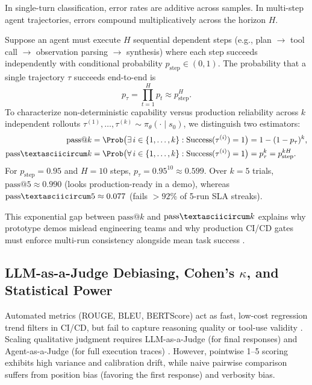 \documentclass[../../../../master.tex]{subfiles}
\begin{document}
In single-turn classification, error rates are additive across samples. In multi-step agent trajectories, errors compound multiplicatively across the horizon $H$.

\begin{coremath}
Suppose an agent must execute $H$ sequential dependent steps (e.g., plan $\to$ tool call $\to$ observation parsing $\to$ synthesis) where each step succeeds independently with conditional probability $p_{\mathrm{step}} \in (0,1)$. The probability that a single trajectory $\tau$ succeeds end-to-end is
\begin{equation}
  p_\tau = \prod_{t=1}^{H} p_t \approx p_{\mathrm{step}}^{H}.
  \label{eq:ops:horizon_decay}
\end{equation}
To characterize non-deterministic capability versus production reliability across $k$ independent rollouts $\tau^{(1)},\dots,\tau^{(k)} \sim \pi_\theta(\cdot \mid s_0)$, we distinguish two estimators:
\begin{align}
  \mathrm{pass@}k &= \Prob\bigl(\exists\, i \in \{1,\dots,k\} : \mathrm{Success}(\tau^{(i)}) = 1\bigr) = 1 - (1 - p_\tau)^k, \label{eq:ops:pass_at_k} \\
  \mathrm{pass\textasciicircum}k &= \Prob\bigl(\forall\, i \in \{1,\dots,k\} : \mathrm{Success}(\tau^{(i)}) = 1\bigr) = p_\tau^k = p_{\mathrm{step}}^{k H}. \label{eq:ops:pass_pow_k}
\end{align}
For $p_{\mathrm{step}} = 0.95$ and $H = 10$ steps, $p_\tau = 0.95^{10} \approx 0.599$. Over $k=5$ trials, $\mathrm{pass@}5 \approx 0.990$ (looks production-ready in a demo), whereas $\mathrm{pass\textasciicircum}5 \approx 0.077$ (fails $>92\%$ of 5-run SLA streaks).
\end{coremath}

This exponential gap between $\mathrm{pass@}k$ and $\mathrm{pass\textasciicircum}k$ explains why prototype demos mislead engineering teams  and why production CI/CD gates must enforce multi-run consistency alongside mean task success .

\subsection{LLM-as-a-Judge Debiasing, Cohen's $\kappa$, and Statistical Power}
\label{sec:ops:judge_math}

Automated metrics (ROUGE, BLEU, BERTScore) act as fast, low-cost regression trend filters in CI/CD, but fail to capture reasoning quality or tool-use validity . Scaling qualitative judgment requires LLM-as-a-Judge (for final responses) and Agent-as-a-Judge (for full execution traces) . However, pointwise 1--5 scoring exhibits high variance and calibration drift, while naive pairwise comparison suffers from position bias (favoring the first response) and verbosity bias.
\end{document}
